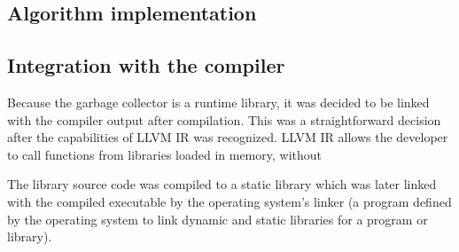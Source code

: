 \subsection{Algorithm implementation}


\subsection{Integration with the compiler}
Because the garbage collector is a runtime library, it was decided to be linked with
the compiler output after compilation. This was a straightforward decision after
the capabilities of LLVM IR was recognized. LLVM IR allows the developer to call
functions from libraries loaded in memory, without  

The library source code was compiled to
a static library which was later linked with the compiled executable by the
operating system's linker (a program defined by the operating system to link
dynamic and static libraries for a program or library).
